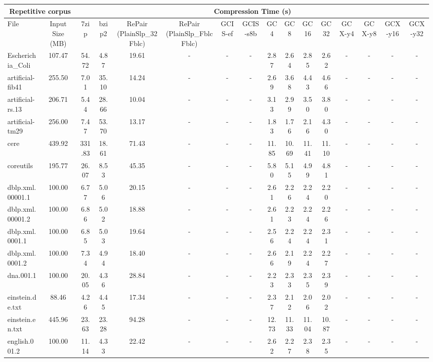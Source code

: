 \begin{table}[]
\centering
\begin{tabular}{|l|c|c|c|c|c|c|c|c|c|c|c|c|c|c|c|}
\hline
\multicolumn{2}{|c|}{Repetitive corpus} & \multicolumn{14}{c|}{Compression Time (s)} \\
\hline
File & Input Size (MB) & 7zip & bzip2 & RePair (PlainSlp\_32Fblc) & RePair (PlainSlp\_FblcFblc) & GCIS-ef & GCIS-s8b & GC4 & GC8 & GC16 & GC32 & GCX-y4 & GCX-y8 & GCX-y16 & GCX-y32 \\
\hline
Escherichia\_Coli & 107.47 & 54.72 & 4.87 & 19.61 & - & - & - & 2.87 & 2.64 & 2.85 & 2.62 & - & - & - & - \\
\hline
artificial-fib41 & 255.50 & 7.01 & 35.10 & 14.24 & - & - & - & 2.69 & 3.68 & 4.43 & 4.66 & - & - & - & - \\
\hline
artificial-rs.13 & 206.71 & 5.44 & 28.66 & 10.04 & - & - & - & 3.13 & 2.99 & 3.50 & 3.80 & - & - & - & - \\
\hline
artificial-tm29 & 256.00 & 7.47 & 53.70 & 13.17 & - & - & - & 1.83 & 1.76 & 2.16 & 4.30 & - & - & - & - \\
\hline
cere & 439.92 & 331.83 & 18.61 & 71.43 & - & - & - & 11.85 & 10.69 & 11.41 & 11.10 & - & - & - & - \\
\hline
coreutils & 195.77 & 26.07 & 8.53 & 45.35 & - & - & - & 5.80 & 5.15 & 4.99 & 4.81 & - & - & - & - \\
\hline
dblp.xml.00001.1 & 100.00 & 6.77 & 5.06 & 20.15 & - & - & - & 2.61 & 2.26 & 2.24 & 2.20 & - & - & - & - \\
\hline
dblp.xml.00001.2 & 100.00 & 6.86 & 5.02 & 18.88 & - & - & - & 2.61 & 2.23 & 2.24 & 2.26 & - & - & - & - \\
\hline
dblp.xml.0001.1 & 100.00 & 6.85 & 5.03 & 19.64 & - & - & - & 2.56 & 2.24 & 2.24 & 2.31 & - & - & - & - \\
\hline
dblp.xml.0001.2 & 100.00 & 7.34 & 4.94 & 18.40 & - & - & - & 2.66 & 2.19 & 2.24 & 2.27 & - & - & - & - \\
\hline
dna.001.1 & 100.00 & 20.05 & 4.36 & 28.84 & - & - & - & 2.23 & 2.33 & 2.35 & 2.39 & - & - & - & - \\
\hline
einstein.de.txt & 88.46 & 4.26 & 4.45 & 17.34 & - & - & - & 2.37 & 2.12 & 2.06 & 2.02 & - & - & - & - \\
\hline
einstein.en.txt & 445.96 & 23.63 & 23.28 & 94.28 & - & - & - & 12.73 & 11.33 & 11.04 & 10.87 & - & - & - & - \\
\hline
english.001.2 & 100.00 & 11.14 & 4.33 & 22.42 & - & - & - & 2.62 & 2.27 & 2.38 & 2.35 & - & - & - & - \\

\end{tabular}
\end{table}
